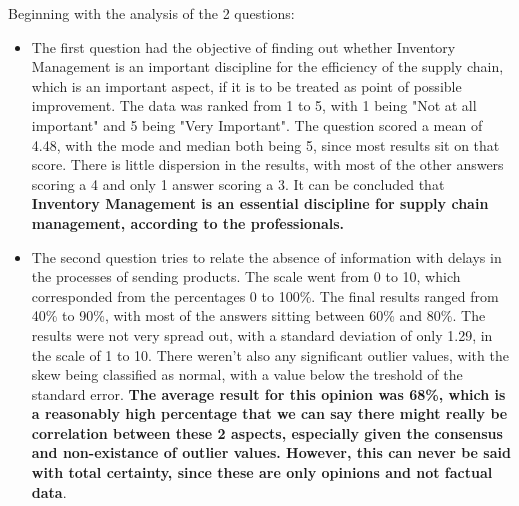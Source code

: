 \pagebreak

Beginning with the analysis of the 2 questions:
\begin{itemize}
  \item The first question had the objective of finding out whether Inventory Management is an important discipline for the efficiency of the supply chain, which is an important aspect, if it is to be treated as point of possible improvement. The data was ranked from 1 to 5, with 1 being "Not at all important" and 5 being "Very Important". The question scored a mean of 4.48, with the mode and median both being 5, since most results sit on that score. There is little dispersion in the results, with most of the other answers scoring a 4 and only 1 answer scoring a 3. It can be concluded that \textbf{Inventory Management is an essential discipline for supply chain management, according to the professionals.}
  \item The second question tries to relate the absence of information with delays in the processes of sending products. The scale went from 0 to 10, which corresponded from the percentages 0 to 100\%. The final results ranged from 40\% to 90\%, with most of the answers sitting between 60\% and 80\%. The results were not very spread out, with a standard deviation of only 1.29, in the scale of 1 to 10. There weren't also any significant outlier values, with the skew being classified as normal, with a value below the treshold of the standard error. \textbf{The average result for this opinion was 68\%, which is a reasonably high percentage that we can say there might really be correlation between these 2 aspects, especially given the consensus and non-existance of outlier values. However, this can never be said with total certainty, since these are only opinions and not factual data}. 
\end{itemize}


